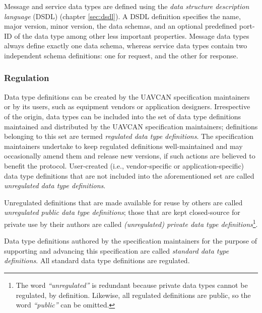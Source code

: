 Message and service data types
are defined using the \emph{data structure description language} (DSDL) (chapter \ref{sec:dsdl}).
A DSDL definition specifies the name, major version, minor version, the data schemas,
and an optional predefined port-ID of the data type among other less important properties.
Message data types always define exactly one data schema, whereas
service data types contain two independent schema definitions: one for request, and the other for response.

\subsubsection{Regulation}\label{sec:basic_concepts_data_type_regulation}

Data type definitions can be created by the UAVCAN specification maintainers or by its users,
such as equipment vendors or application designers.
Irrespective of the origin, data types can be included into the set of data type definitions maintained
and distributed by the UAVCAN specification maintainers;
definitions belonging to this set are termed \emph{regulated data type definitions}.
The specification maintainers undertake to keep regulated definitions well-maintained and may occasionally
amend them and release new versions, if such actions are believed to benefit the protocol.
User-created (i.e., vendor-specific or application-specific) data type definitions that are
not included into the aforementioned set are called \emph{unregulated data type definitions}.

Unregulated definitions that are made available for reuse by others are called
\emph{unregulated public data type definitions};
those that are kept closed-source for private use by their authors are called
\emph{(unregulated) private data type definitions}\footnote{The word \emph{``unregulated''} is redundant
because private data types cannot be regulated, by definition.
Likewise, all regulated definitions are public, so the word \emph{``public''} can be omitted.}.

Data type definitions authored by the specification maintainers for the purpose of supporting and advancing
this specification are called \emph{standard data type definitions}.
All standard data type definitions are regulated.

